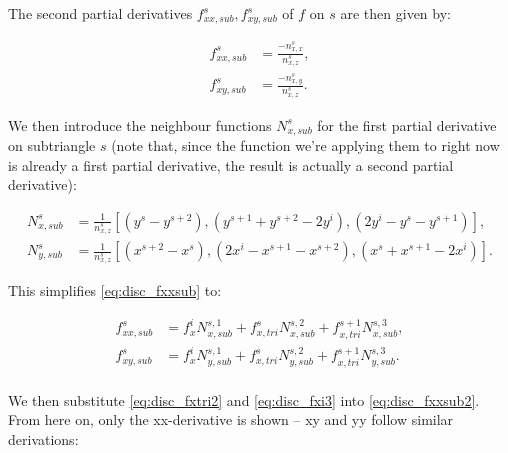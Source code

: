 \documentclass{article}
\begin{document}
The second partial derivatives $f_{xx,sub}^s, f_{xy,sub}^s$ of $f$ on $s$ are then given by:

\begin{equation} \label{eq:disc_fxxsub}
\begin{split}
f_{xx,sub}^s &= \frac{-n_{x,x}^s}{n_{x,z}^s}, \\
f_{xy,sub}^s &= \frac{-n_{x,y}^s}{n_{x,z}^s}.
\end{split}
\end{equation}

We then introduce the neighbour functions $N_{x,sub}^s$ for the first partial derivative on subtriangle $s$ (note that, since the function we're applying them to right now is already a first partial derivative, the result is actually a second partial derivative):

\begin{equation} \label{eq:disc_Nxsub}
\begin{split}
N_{x,sub}^s &= \frac{1}{n_{x,z}^s} \left[ (y^s - y^{s+2}), (y^{s+1} + y^{s+2} - 2y^i), (2y^i - y^s - y^{s+1}) \right], \\
N_{y,sub}^s &= \frac{1}{n_{x,z}^s} \left[ (x^{s+2} - x^s), (2x^i - x^{s+1} - x^{s+2}), (x^s + x^{s+1} - 2x^i) \right].
\end{split}
\end{equation}

This simplifies \eqref{eq:disc_fxxsub} to:

\begin{equation} \label{eq:disc_fxxsub2}
\begin{split}
f_{xx,sub}^s &= f_x^i N_{x,sub}^{s,1} + f_{x,tri}^s N_{x,sub}^{s,2} + f_{x,tri}^{s+1} N_{x,sub}^{s,3}, \\
f_{xy,sub}^s &= f_x^i N_{y,sub}^{s,1} + f_{x,tri}^s N_{y,sub}^{s,2} + f_{x,tri}^{s+1} N_{y,sub}^{s,3}. \\
\end{split}
\end{equation}

We then substitute \eqref{eq:disc_fxtri2} and \eqref{eq:disc_fxi3} into \eqref{eq:disc_fxxsub2}. From here on, only the xx-derivative is shown – xy and yy follow similar derivations:
\end{document}

